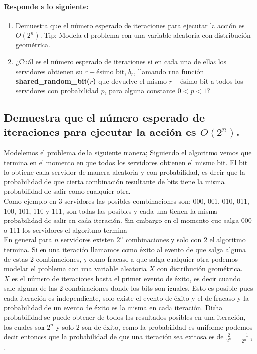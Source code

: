 \documentclass[12pt]{article}
\begin{document}
\paragraph{Responde a lo siguiente:}
\begin{enumerate}
	\item Demuestra que el número esperado de iteraciones para ejecutar la acción es $O(2^n)$. Tip: Modela el problema con una variable aleatoria con distribución geométrica.
	\item ¿Cuál es el número esperado de iteraciones si en cada una de ellas los servidores obtienen su $r-$ésimo bit, $b_r$, llamando una función \textbf{shared\_random\_bit($r$)} que devuelve el mismo $r-$ésimo bit a todos los servidores con probabilidad $p$, para alguna constante $0 < p < 1$?
\end{enumerate}
\subsection{Demuestra que el número esperado de iteraciones para ejecutar la acción es $O(2^n)$.}
Modelemos el problema de la siguiente manera; Siguiendo el algoritmo vemos que termina en el momento en que todos los servidores obtienen el mismo bit. El bit lo obtiene cada servidor de manera aleatoria y con probabilidad, es decir que la probabilidad de que cierta combinación resultante de bits tiene la misma probabilidad de salir como cualquier otra.\\ Como ejemplo en 3 servidores las posibles combinaciones son:
000, 001, 010, 011, 100, 101, 110 y 111, son todas las posibles y cada una tienen la misma probabilidad de salir en cada iteración. Sin embargo en el momento que salga 000 o 111 los servidores el algoritmo termina.\\
En general para $n$ servidores existen $2^n$ combinaciones y solo con 2 el algoritmo termina. Si en una iteración llamamos como éxito al evento de que salga alguna de estas 2 combinaciones, y como fracaso a que salga cualquier otra podemos modelar el problema con una variable aleatoria $X$ con distribución geométrica.\\
$X$ es el número de iteraciones hasta el primer evento de éxito, es decir cuando sale alguna de las 2 combinaciones donde los bits son iguales. Esto es posible pues cada iteración es independiente, solo existe el evento de éxito y el de fracaso y la probabilidad de un evento de éxito es la misma en cada iteración.
Dicha probabilidad se puede obtener de todos los resultados posibles en una iteración, los cuales son $2^n$ y solo $2$ son de éxito, como la probabilidad es uniforme podemos decir entonces que la probabilidad de que una iteración sea exitosa es de $\frac{2}{2^n} = \frac{1}{2^{n-1}}$ .\\
\end{document}
